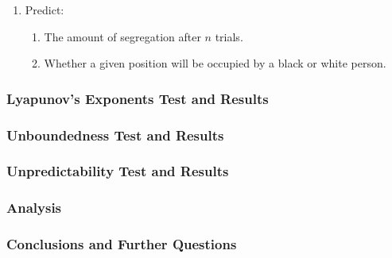 \documentclass[11pt, handout]{beamer}
\begin{document}
\begin{frame}
\begin{enumerate}
\begin{enumerate}
\begin{enumerate}
                    \end{enumerate}
                \item Predict:
                    \begin{enumerate}
                        \item The amount of segregation after $n$ trials.
                        \item Whether a given position will be occupied by a black or white person.
                    \end{enumerate}
            \end{enumerate}
    \end{enumerate}
\end{frame}

\begin{frame}
    \frametitle{Lyapunov's Exponents Test and Results}
\end{frame}

\begin{frame}
    \frametitle{Unboundedness Test and Results}
\end{frame}

\begin{frame}
    \frametitle{Unpredictability Test and Results}
\end{frame}

\begin{frame}
    \frametitle{Analysis}
\end{frame}

\begin{frame}
    \frametitle{Conclusions and Further Questions}
\end{frame}
\end{document}
